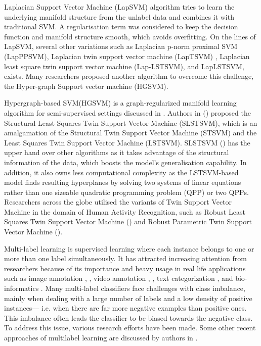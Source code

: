 \documentclass[12pt,a4paper,oneside,english]{report}
\begin{document}
Laplacian Support Vector Machine (LapSVM)\cite{melacci2011laplacian} algorithm tries to learn the underlying manifold structure from the unlabel data and combines it with traditional SVM. A regularisation term was considered to keep the decision function and manifold structure smooth, which avoids overfitting. On the lines of LapSVM\cite{melacci2011laplacian}, several other variations such as Laplacian p-norm proximal SVM (LapPPSVM)\cite{tan2014laplacian}, Laplacian twin support vector machine (LapTSVM) \cite{qi2012laplacian}, Laplacian least square twin support vector machine (Lap-LSTSVM)\cite{chen2014laplacian}, and LapLSTSVM\cite{khemchandani2016multi}, exists. Many researchers proposed another algorithm to overcome this challenge, the Hyper-graph Support vector machine (HGSVM)\cite{sun2022hypergraph}.

Hypergraph-based SVM(HGSVM) is a graph-regularized manifold learning algorithm for semi-supervised settings discussed in \cite{sun2022hypergraph}. Authors in (\cite{Xu2015}) proposed the Structural Least Squares Twin Support Vector Machine (SLSTSVM), which is an amalgamation of the Structural Twin Support Vector Machine (STSVM) \cite{qi2013structural} and the Least Squares Twin Support Vector Machine (LSTSVM)\cite{kumar2009least}. SLSTSVM (\cite{Xu2015}) has the upper hand over other algorithms as it takes advantage of the structural information of the data, which boosts the model's generalisation capability. In addition, it also owns less computational complexity as the LSTSVM-based model finds resulting hyperplanes by solving two systems of linear equations rather than one sizeable quadratic programming problem (QPP) or two QPPs. 
Researchers across the globe utilised the variants of Twin Support Vector Machine in the domain of Human Activity Recognition, such as Robust Least Squares Twin Support Vector Machine (\cite{khemchandani2016robust}) and Robust Parametric Twin Support Vector Machine (\cite{khemchandani2017robust}).


Multi-label learning is supervised learning where each instance belongs to one or more than one label simultaneously. It has attracted increasing attention from researchers because of its importance and heavy usage in real life applications such as image annotation \cite{boutell2004learning}, \cite{hong2013image}, video annotation \cite{kang2006correlated}, \cite{qi2007correlative}, text categorization \cite{mccallum1999multi}, \cite{zhang2006multilabel} and bio-informatics \cite{clare2001knowledge}.
Many multi-label classifiers face challenges with class imbalance, mainly when dealing with a large number of labels and a low density of positive instances— i.e. when there are far more negative examples than positive ones. This imbalance often leads the classifier to be biased towards the negative class. To address this issue, various research efforts have been made.  Some other recent approaches of multilabel learning are discussed by authors in \cite{kumar2023multi, rastogi2022multi,rastogi2022imbalance,rastogi2023discriminatory,kumar2022low,rastogi2021multi}.
\end{document}
